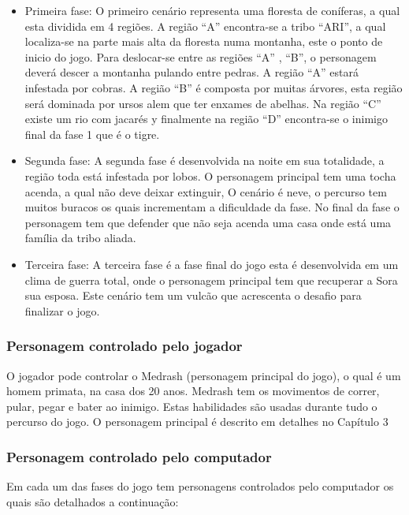 \begin{itemize}
\item Primeira fase: 
O primeiro cenário representa uma floresta de coníferas, a qual esta dividida em 
4 regiões. A região ``A'' encontra-se a tribo ``ARI'', a qual localiza-se na parte mais alta
 da floresta numa montanha, este o ponto de inicio do jogo. Para deslocar-se entre
 as regiões ``A'' , ``B'', o personagem deverá descer a montanha pulando entre pedras.
 A região ``A'' estará infestada por cobras. A região ``B'' é composta por muitas árvores,
 esta região será dominada por ursos alem que ter enxames de abelhas. Na região ``C'' 
existe um rio com jacarés y finalmente na região ``D'' encontra-se o inimigo final da fase 1 
que é o tigre.

\item Segunda fase: 
A segunda fase é desenvolvida na noite em sua totalidade, a região toda está infestada 
por lobos. O personagem principal tem uma tocha acenda, a qual não deve deixar
 extinguir, O cenário é neve, o percurso tem muitos buracos os quais incrementam 
a dificuldade da fase. No final da fase o personagem tem que defender que não seja
 acenda uma casa onde está uma família da tribo aliada.

\item Terceira fase: 
A terceira fase é a fase final do jogo esta é desenvolvida em um clima de guerra total,
 onde o personagem principal tem que recuperar a Sora sua esposa. Este cenário tem 
um vulcão que acrescenta o desafio para finalizar o jogo. 
\end{itemize}


\subsubsection{Personagem controlado pelo jogador}
O jogador pode controlar o Medrash (personagem principal do jogo), o qual é um 
homem primata, na casa dos 20 anos. Medrash tem os movimentos de correr, pular, 
pegar e bater ao inimigo. Estas habilidades são usadas durante tudo o percurso do jogo. 
O personagem principal é descrito em detalhes no Capítulo 3

\subsubsection{Personagem controlado pelo computador}
Em cada um das fases do jogo tem personagens controlados pelo computador os quais 
são detalhados a continuação:


